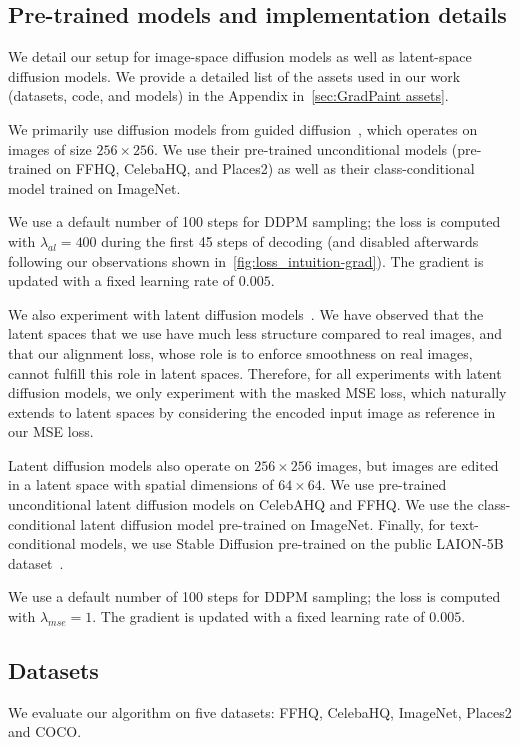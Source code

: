 \subsection{Pre-trained models and implementation details} 
We detail our setup for image-space diffusion models as well as latent-space diffusion models.
We provide a detailed list of the assets 
used in our work (datasets, code, and models) in
the Appendix in~\ref{sec:GradPaint assets}.

We primarily use diffusion models from guided diffusion~\citep{dhariwal2021diffusion}, which operates on images of size $256\times256$. 
We use their pre-trained unconditional models (pre-trained on FFHQ, CelebaHQ, and Places2)  as well as their class-conditional model
trained on ImageNet. 

We use a default number of 100 steps for \ac{DDPM} 
sampling; the loss is computed with $\lambda_{al} =400$ during the first 45 steps of decoding (and disabled afterwards following 
our observations shown in~\ref{fig:loss_intuition-grad}). The gradient is updated with a fixed learning rate of $0.005$.



We also experiment with latent diffusion models~\citep{rombach2022high}.  We have observed that the latent spaces that we use have much
 less structure compared to real images, and that our alignment loss, whose role is to enforce smoothness on real images, 
 cannot fulfill this role in latent spaces. Therefore, for all experiments with latent diffusion models, we only experiment with 
 the masked MSE loss, which 
 naturally extends to latent spaces by considering the encoded input image as reference in our MSE loss.

Latent diffusion models also operate on $256\times256$ images, but images are
 edited in a latent space with spatial dimensions of $64\times64$.
 We use pre-trained unconditional latent diffusion models on CelebAHQ and FFHQ. We use the class-conditional 
 latent diffusion model pre-trained on ImageNet. Finally, for text-conditional models, we use Stable Diffusion pre-trained on the 
 public LAION-5B dataset~\citep{schuhmann2022laion}.

 We use a default number of 100 steps for DDPM sampling; the loss is computed with $\lambda_{mse} = 1$.
 The gradient is updated with a fixed learning rate of $0.005$.


\subsection{Datasets}
We evaluate our algorithm on five datasets: FFHQ, CelebaHQ, ImageNet, Places2 and COCO.

